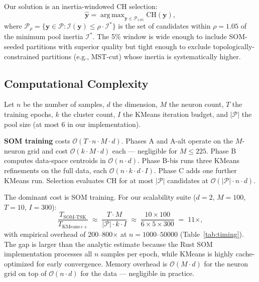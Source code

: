 \documentclass[journal]{IEEEtran}
\DeclareMathOperator*{\argmax}{arg\,max}
\begin{document}
Our solution is an inertia-windowed CH selection:
\begin{equation}
  \hat{\mathbf{y}} = \argmax_{\mathbf{y} \in \mathcal{P}_{1.05}} \mathrm{CH}(\mathbf{y}),
  \label{eq:selection}
\end{equation}
where $\mathcal{P}_\rho = \{\mathbf{y} \in \mathcal{P} : \mathcal{I}(\mathbf{y}) \le \rho \cdot \mathcal{I}^*\}$ is the set of candidates within $\rho = 1.05$ of the minimum pool inertia $\mathcal{I}^*$. The 5\% window is wide enough to include SOM-seeded partitions with superior quality but tight enough to exclude topologically-constrained partitions (e.g., MST-cut) whose inertia is systematically higher.

\subsection{Computational Complexity}
\label{sec:complexity}

Let $n$ be the number of samples, $d$ the dimension, $M$ the neuron count, $T$ the training epochs, $k$ the cluster count, $I$ the KMeans iteration budget, and $|\mathcal{P}|$ the pool size (at most 6 in our implementation).

\textbf{SOM training} costs $\mathcal{O}(T \cdot n \cdot M \cdot d)$. Phases A and A-alt operate on the $M$-neuron grid and cost $\mathcal{O}(k \cdot M \cdot d)$ each — negligible for $M \le 225$. Phase B computes data-space centroids in $\mathcal{O}(n \cdot d)$. Phase B-bis runs three KMeans refinements on the full data, each $\mathcal{O}(n \cdot k \cdot d \cdot I)$. Phase C adds one further KMeans run. Selection evaluates CH for at most $|\mathcal{P}|$ candidates at $\mathcal{O}(|\mathcal{P}| \cdot n \cdot d)$.

The dominant cost is SOM training. For our scalability suite ($d=2$, $M=100$, $T=10$, $I=300$):
\begin{equation}
  \frac{T_{\text{SOM-TSK}}}{T_{\text{KMeans++}}} \;\approx\; \frac{T \cdot M}{|\mathcal{P}| \cdot k \cdot I} \;\approx\; \frac{10 \times 100}{6 \times 5 \times 300} \;=\; 11\times,
\end{equation}
with empirical overhead of 200--800$\times$ at $n=1000$--$50000$ (Table~\ref{tab:timing}). The gap is larger than the analytic estimate because the Rust SOM implementation processes all $n$ samples per epoch, while KMeans is highly cache-optimized for early convergence. Memory overhead is $\mathcal{O}(M \cdot d)$ for the neuron grid on top of $\mathcal{O}(n \cdot d)$ for the data — negligible in practice.
\end{document}
